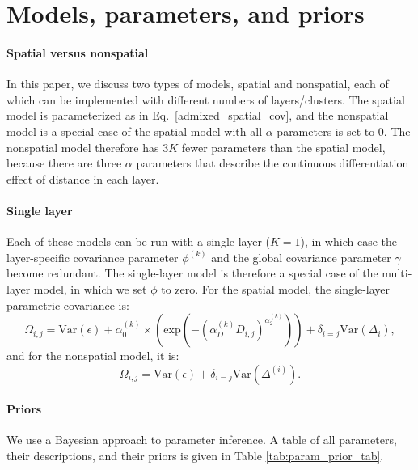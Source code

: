 \documentclass[10pt,letterpaper]{article}
\begin{document}
\section*{Models, parameters, and priors}\label{model_app}
\paragraph{Spatial versus nonspatial}
In this paper, we discuss two types of models, spatial and nonspatial, 
each of which can be implemented with different numbers of layers/clusters.
The spatial model is parameterized as in Eq.\ \eqref{admixed_spatial_cov},
and the nonspatial model
is a special case of the spatial model with all $\alpha$ parameters is set to 0.
The nonspatial model therefore has $3K$ fewer parameters than the spatial model,
because there are three $\alpha$ parameters that describe the continuous differentiation effect of distance in each layer.

\paragraph{Single layer}
Each of these models can be run with a single layer ($K=1$), 
in which case the layer-specific covariance parameter $\phi^{(k)}$ 
and the global covariance parameter $\gamma$ become redundant.
The single-layer model is therefore a special case of the multi-layer model, 
in which we set $\phi$ to zero.
For the spatial model, the single-layer parametric covariance is:
\begin{equation}
\Omega_{i,j} = \text{Var}(\epsilon) + 
\alpha^{(k)}_0 \times \left(\text{exp} \left(  -(\alpha^{(k)}_D D_{i,j})^{\alpha^{(k)}_2}\right) \right)	 +
\delta_{i=j} \text{Var}(\Delta_i), 
\label{admixed_continuous_cov}
\end{equation}
and for the nonspatial model, it is:
\begin{equation}
\Omega_{i,j} = \text{Var}(\epsilon) + \delta_{i=j} \text{Var}(\Delta^{(i)}) .
\label{admixed_discrete_covariance}
\end{equation}

\paragraph{Priors}
We use a Bayesian approach to parameter inference.
A table of all parameters, their descriptions, and their priors is given in Table \ref{tab:param_prior_tab}.
\end{document}
